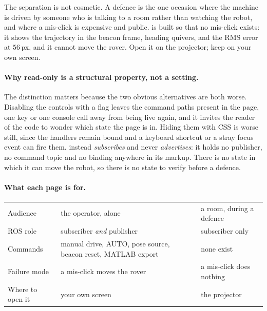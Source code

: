 The separation is not cosmetic. A defence is the one occasion where the
machine is driven by someone who is talking to a room rather than watching the
robot, and where a mis-click is expensive and public.  is
built so that no mis-click exists: it shows the trajectory in the beacon
frame, heading quivers, and the RMS error at $56$\,px, and it cannot move the
rover. Open it on the projector; keep  on your own screen.

\paragraph{Why read-only is a structural property, not a setting.}
The distinction matters because the two obvious alternatives are both worse.
Disabling the controls with a flag leaves the command paths present in the
page, one  key or one console call away from being live
again, and it invites the reader of the code to wonder which state the page is
in. Hiding them with CSS is worse still, since the handlers remain bound and a
keyboard shortcut or a stray focus event can fire them. 
instead \emph{subscribes} and never \emph{advertises}: it holds no publisher,
no command topic and no  binding anywhere in its markup. There
is no state in which it can move the robot, so there is no state to verify
before a defence.

\paragraph{What each page is for.}
\begin{center}
\small
\begin{tabular}{@{}lL{4.5cm}L{4.5cm}@{}}
\toprule
 &  &  \\
\midrule
Audience     & the operator, alone & a room, during a defence \\
ROS role     & subscriber \emph{and} publisher & subscriber only \\
Commands     & manual drive, AUTO, pose source, beacon reset, MATLAB export & none exist \\
Failure mode & a mis-click moves the rover & a mis-click does nothing \\
Where to open it & your own screen & the projector \\
\bottomrule
\end{tabular}
\end{center}

